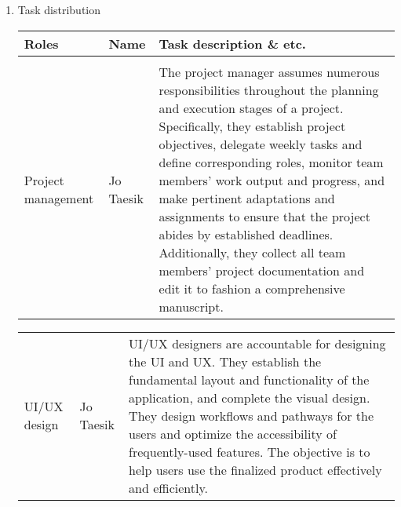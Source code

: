 \begin{enumerate}[label=\arabic*]
    \item {\large{Task distribution}}
          \begin{table}[H]
              \center
              \begin{tabular}{m{1.4cm} m{1.5cm} m{4cm}}
                  \toprule
                  Roles              & Name      & Task description \& etc.                                                                                                                                                                                                                                                                                                                                                                                                                                                                                 \\
                  \midrule
                  \\
                  Project management & Jo Taesik & The project manager assumes numerous responsibilities throughout the planning and execution stages of a project. Specifically, they establish project objectives, delegate weekly tasks and define corresponding roles, monitor team members' work output and progress, and make pertinent adaptations and assignments to ensure that the project abides by established deadlines. Additionally, they collect all team members' project documentation and edit it to fashion a comprehensive manuscript. \\
              \end{tabular}
          \end{table}

          \begin{table}[H]
              \center
              \begin{tabular}{m{1.4cm} m{1.5cm} m{4cm}}
                  UI/UX design & Jo Taesik & UI/UX designers are accountable for designing the UI and UX. They establish the fundamental layout and functionality of the application, and complete the visual design. They design workflows and pathways for the users and optimize the accessibility of frequently-used features. The objective is to help users use the finalized product effectively and efficiently. \\
              \end{tabular}
          \end{table}


\end{enumerate}
